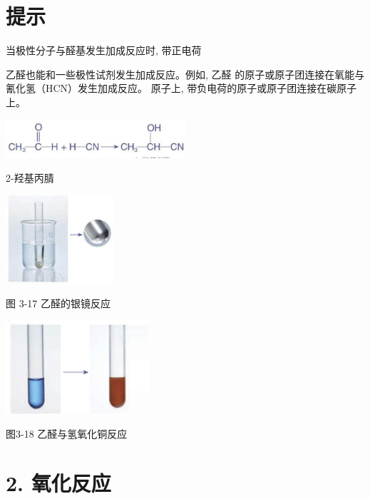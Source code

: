 \documentclass[10pt]{article}
\begin{document}
\section*{提示}

当极性分子与醛基发生加成反应时, 带正电荷

乙醛也能和一些极性试剂发生加成反应。例如, 乙醛 的原子或原子团连接在氧能与氰化氢（HCN）发生加成反应。 原子上, 带负电荷的原子或原子团连接在碳原子上。

\begin{center}
\includegraphics[max width=0.5\textwidth]{images/0190efc5-b58a-7c43-bfb0-e0a030df9cfd_74_672117.jpg}
\end{center}

2-羟基丙腈

\begin{mdframed}

\begin{center}
\includegraphics[max width=0.3\textwidth]{images/0190efc5-b58a-7c43-bfb0-e0a030df9cfd_74_687637.jpg}
\end{center}

图 3-17 乙醛的银镜反应

\begin{center}
\includegraphics[max width=0.4\textwidth]{images/0190efc5-b58a-7c43-bfb0-e0a030df9cfd_74_836117.jpg}
\end{center}

图3-18 乙醛与氢氧化铜反应

\end{mdframed}

\section*{2. 氧化反应}
\end{document}
